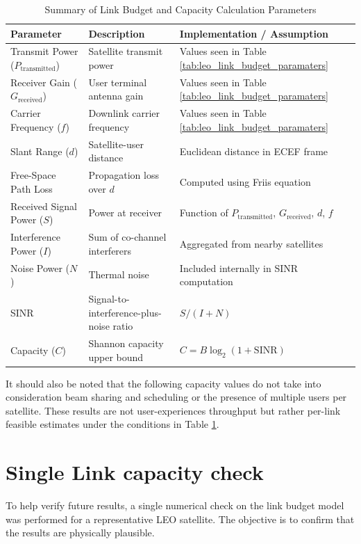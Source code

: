 \begin{table}[h]
\centering
\caption{Summary of Link Budget and Capacity Calculation Parameters}
\label{tab:link_budget_summary}
\begin{tabular}{|l|l|l|}
\hline
\textbf{Parameter} & \textbf{Description} & \textbf{Implementation / Assumption} \\
\hline
Transmit Power ($P_\mathrm{transmitted}$) & Satellite transmit power & Values seen in Table \ref{tab:leo_link_budget_paramaters} \\
\hline
Receiver Gain ($G_\mathrm{received}$) & User terminal antenna gain & Values seen in Table \ref{tab:leo_link_budget_paramaters}\\
\hline
Carrier Frequency ($f$) & Downlink carrier frequency & Values seen in Table \ref{tab:leo_link_budget_paramaters} \\
\hline
Slant Range ($d$) & Satellite-user distance & Euclidean distance in ECEF frame \\
\hline
Free-Space Path Loss & Propagation loss over $d$ & Computed using Friis equation \\
\hline
Received Signal Power ($S$) & Power at receiver & Function of $P_\mathrm{transmitted}$, $G_\mathrm{received}$, $d$, $f$ \\
\hline
Interference Power ($I$) & Sum of co-channel interferers & Aggregated from nearby satellites \\
\hline
Noise Power ($N$) & Thermal noise & Included internally in SINR computation \\
\hline
SINR & Signal-to-interference-plus-noise ratio & $S / (I + N)$ \\
\hline
Capacity ($C$) & Shannon capacity upper bound & $C = B \log_2(1 + \mathrm{SINR})$ \\
\hline
\end{tabular}
\end{table}


It should also be noted that the following capacity values do not take into consideration beam sharing and scheduling or the presence of multiple users per satellite. These results are not user-experiences throughput but rather per-link feasible estimates under the conditions in Table \ref{tab:link_budget_summary}.

\section{Single Link capacity check}
To help verify future results, a single numerical check on the link budget model was performed for a representative LEO satellite. The objective is to confirm that the results are physically plausible. 

